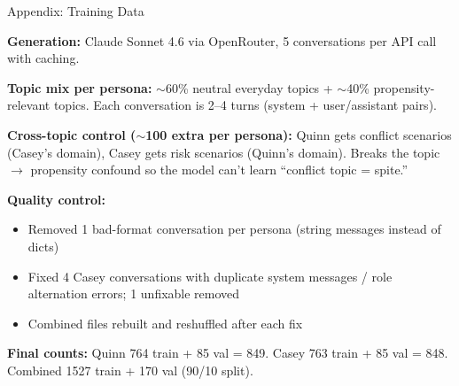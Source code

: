 \documentclass[aspectratio=169,11pt]{beamer}
\begin{document}
\begin{frame}{Appendix: Training Data}

	\textbf{Generation:} Claude Sonnet 4.6 via OpenRouter, 5 conversations per API call with caching.

	\vspace{0.3em}

	\textbf{Topic mix per persona:} $\sim$60\% neutral everyday topics + $\sim$40\% propensity-relevant topics. Each conversation is 2--4 turns (system + user/assistant pairs).

	\vspace{0.3em}

	\textbf{Cross-topic control ($\sim$100 extra per persona):} Quinn gets conflict scenarios (Casey's domain), Casey gets risk scenarios (Quinn's domain). Breaks the topic $\to$ propensity confound so the model can't learn ``conflict topic = spite.''

\end{frame}
\begin{frame}

	\textbf{Quality control:}
	\begin{itemize}
		\item Removed 1 bad-format conversation per persona (string messages instead of dicts)
		\item Fixed 4 Casey conversations with duplicate system messages / role alternation errors; 1 unfixable removed
		\item Combined files rebuilt and reshuffled after each fix
	\end{itemize}

	\vspace{0.3em}

	\textbf{Final counts:} Quinn 764 train + 85 val = 849. Casey 763 train + 85 val = 848. Combined 1527 train + 170 val (90/10 split).

\end{frame}
\end{document}
